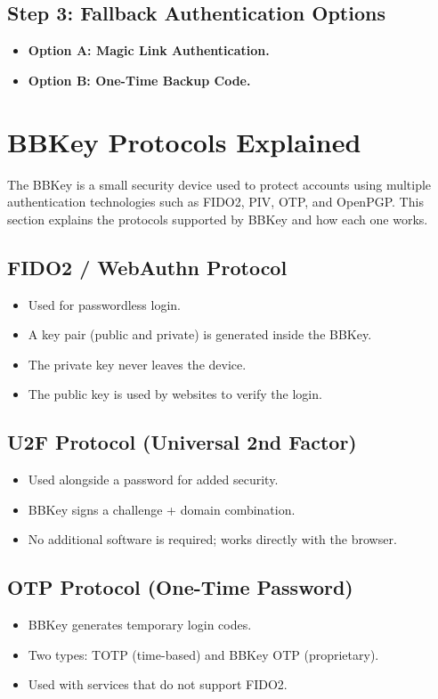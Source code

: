 \documentclass{article}[12pt]
\begin{document}
\subsection*{Step 3: Fallback Authentication Options}
\begin{itemize}
    \item \textbf{Option A: Magic Link Authentication.}
    \item \textbf{Option B: One-Time Backup Code.}
\end{itemize}

\section*{BBKey Protocols Explained}
The BBKey is a small security device used to protect accounts using multiple authentication technologies such as FIDO2, PIV, OTP, and OpenPGP. This section explains the protocols supported by BBKey and how each one works.

\subsection*{FIDO2 / WebAuthn Protocol}
\begin{itemize}
    \item Used for passwordless login.
    \item A key pair (public and private) is generated inside the BBKey.
    \item The private key never leaves the device.
    \item The public key is used by websites to verify the login.
\end{itemize}

\subsection*{U2F Protocol (Universal 2nd Factor)}
\begin{itemize}
    \item Used alongside a password for added security.
    \item BBKey signs a challenge + domain combination.
    \item No additional software is required; works directly with the browser.
\end{itemize}

\subsection*{OTP Protocol (One-Time Password)}
\begin{itemize}
    \item BBKey generates temporary login codes.
    \item Two types: TOTP (time-based) and BBKey OTP (proprietary).
    \item Used with services that do not support FIDO2.
\end{itemize}
\end{document}
